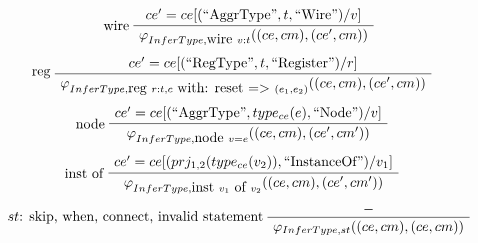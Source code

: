 {\begin{table}[htbp]
  \footnotesize
  \begin{gather*}
    \infer[wire]
    {\seqq{\varphi_{InferType, \mbox{wire }v:t}((ce, cm), (ce', cm))}}
   {\seqq{ce' = ce [(\mbox{``AggrType''}, t, \mbox{``Wire''})/v]}}
    \\[1ex]
    \infer[reg]
    {\varphi_{InferType, \mbox{reg } r:t, c \mbox{ with: reset => }(e_1, e_2)}((ce, cm), (ce', cm))}
   {\seqq{ce' = ce [(\mbox{``RegType''}, t, \mbox{``Register''})/r]}}
    \quad
    \\[1ex]
    \infer[node]
    {\seqq{\varphi_{InferType, \mbox{node } v = e} ((ce, cm), (ce', cm'))}}
   {\seqq{ce' = ce[(\mbox{``AggrType''}, type_{ce}(e), \mbox{``Node''})/v]}}
    \quad
    \\[1ex]
    \infer[inst of]
    {\varphi_{InferType, \mbox{inst } v_1 \mbox{ of } v_2} ((ce, cm), (ce', cm'))}
   {\seqq{ce' = ce[(prj_{1,2}(type_{ce}(v_2)), \mbox{``InstanceOf''})/v_1] }}
  \quad
    \\[1ex]
    \infer[$st$: skip, when, connect, invalid statement]
    {\varphi_{InferType, st} ((ce, cm), (ce, cm))}
   {\seqq{-}}
  \end{gather*}
  \caption{Semantics of InferType compilation pass}
  \label{tab:infertype-sem}
\end{table}
}


